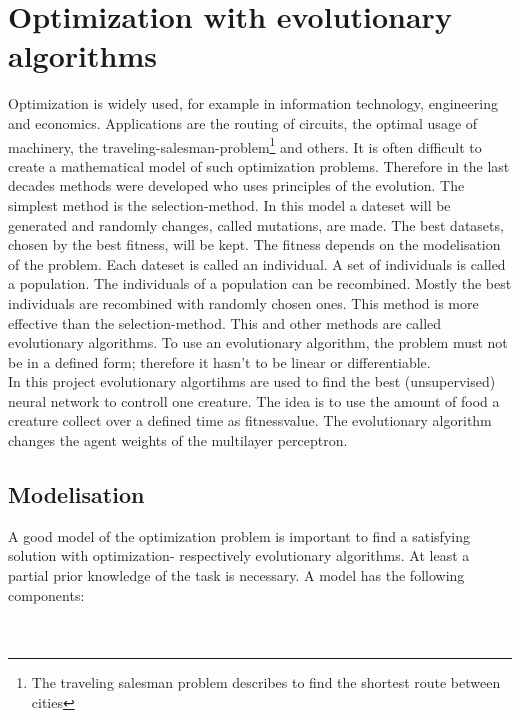 \documentclass[10pt,a4paper,DIV=11]{scrreprt}
\begin{document}
\chapter{Optimization with evolutionary algorithms}
\label{sec:evo}
Optimization is widely used, for example in information technology, engineering and
economics. Applications are the routing of circuits, the optimal usage of machinery,
the traveling-salesman-problem\footnote{The traveling salesman problem describes to find the shortest route between cities} and others. It is often difficult to create a mathematical
model of such optimization problems. Therefore in the last decades methods were developed who
uses principles of the evolution.
The simplest method is the selection-method. In this model a dateset will be generated and randomly changes, called mutations, are made. The best datasets, chosen by the best fitness, will be kept. The fitness depends on the modelisation of the problem.
Each dateset is called an individual. A set of individuals is called a population. The individuals
of a population can be recombined. Mostly the best individuals are recombined with randomly chosen
ones. This method is more effective than the selection-method. This and other methods are  called
evolutionary algorithms. To use an evolutionary algorithm, the problem must not be in a defined form;
therefore it hasn't to be linear or differentiable. \\

In this project evolutionary algortihms are used to find the best 
(unsupervised) neural network to controll one creature. The idea is to use the amount of food a creature collect over a defined time as fitnessvalue. The evolutionary algorithm changes the agent weights of the multilayer perceptron.

\section{Modelisation}
A good model of the optimization problem is important to find a satisfying solution with optimization- respectively evolutionary algorithms. At least a partial prior knowledge of the task is necessary.
A model has the following components: \\

   \\
\\
\end{document}
